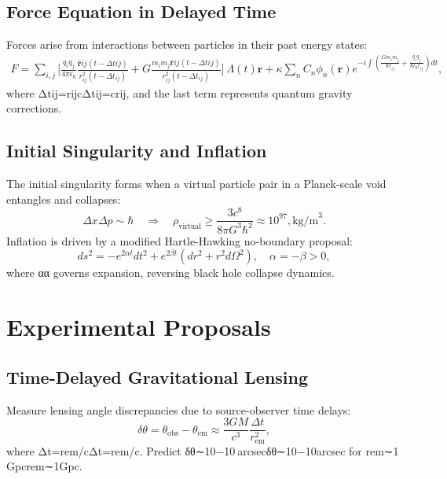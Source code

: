 \documentclass{article}
\begin{document}
\subsection{Force Equation in Delayed Time}
Forces arise from interactions between particles in their past energy states:
\begin{multline}
F = \sum_{i,j} \Bigg[ \frac{q_i q_j}{4\pi \epsilon_0} \frac{\hat{\bm{r}}{ij}(t - \Delta t{ij})}{r_{ij}^2(t - \Delta t_{ij})} + G \frac{m_i m_j \hat{\bm{r}}{ij}(t - \Delta t{ij})}{r_{ij}^2(t - \Delta t_{ij})} \Bigg] \

    \Lambda(t) \bm{r} + \kappa \sum_{n} C_n \phi_n(\bm{r}) e^{-i \int \left( \frac{G m_i m_j}{\hbar r_{ij}} + \frac{q_i q_j}{\hbar \epsilon_0 r_{ij}} \right) dt}, \label{eq:force }
    \end{multline}
    where Δtij=rijcΔtij​=crij​​, and the last term represents quantum gravity corrections.

\subsection{Initial Singularity and Inflation}
The initial singularity forms when a virtual particle pair in a Planck-scale void entangles and collapses:
\begin{equation}
\Delta x \Delta p \sim \hbar \quad \Rightarrow \quad \rho_{\text{virtual}} \geq \frac{3c^8}{8\pi G^3 \hbar^2} \approx 10^{97} , \text{kg/m}^3. \label{eq:singularity }
\end{equation}
Inflation is driven by a modified Hartle-Hawking no-boundary proposal:
\begin{equation}
ds^2 = -e^{2\alpha t} dt^2 + e^{2\beta t} \left( dr^2 + r^2 d\Omega^2 \right), \quad \alpha = -\beta > 0, \label{eq:metric }
\end{equation}
where αα governs expansion, reversing black hole collapse dynamics.

\section{Experimental Proposals}
\subsection{Time-Delayed Gravitational Lensing}
Measure lensing angle discrepancies due to source-observer time delays:
\begin{equation}
\delta \theta = \theta_{\text{obs}} - \theta_{\text{em}} \approx \frac{3GM}{c^3} \frac{\Delta t}{r_{\text{em}}^2}, \label{eq:lensing }
\end{equation}
where Δt=rem/cΔt=rem​/c. Predict δθ∼10−10 arcsecδθ∼10−10arcsec for rem∼1 Gpcrem​∼1Gpc.
\end{document}
